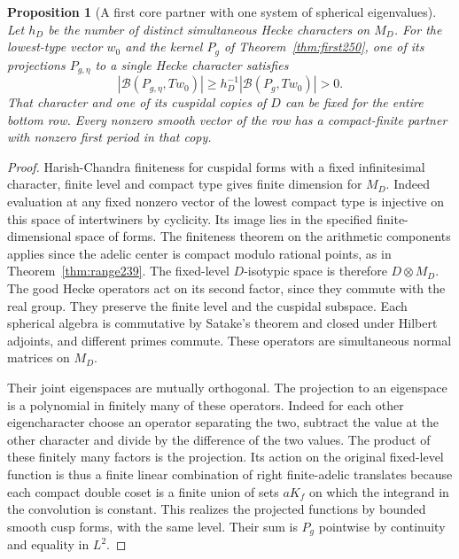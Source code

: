 \documentclass[a4paper,11pt]{article}
\newtheorem{proposition}{Proposition}[section]
\theoremstyle{definition}
\theoremstyle{remark}
\numberwithin{equation}{section}
\begin{document}
\begin{proposition}[A first core partner with one system of spherical eigenvalues]
\label{prop:heckecore252}
Let \(h_D\) be the number of distinct simultaneous Hecke characters on
\(M_D\). For the lowest-type vector \(w_0\) and the kernel \(P_g\) of
Theorem~\ref{thm:first250}, one of its projections \(P_{g,\eta}\) to a
single Hecke character satisfies
\[
 |\mathcal B(P_{g,\eta},Tw_0)|\ge h_D^{-1}|\mathcal B(P_g,Tw_0)|>0 .
\]
That character and one of its cuspidal copies of \(D\) can be fixed for
the entire bottom row. Every nonzero smooth vector of the row has a
compact-finite partner with nonzero first period in that copy.
\end{proposition}
\begin{proof}
Harish-Chandra finiteness for cuspidal forms with a fixed infinitesimal
character, finite level and compact type gives finite dimension for
\(M_D\). Indeed evaluation at any fixed nonzero vector of the lowest
compact type is injective on this space of intertwiners by cyclicity.
Its image lies in the specified finite-dimensional space of forms.
The finiteness theorem on the arithmetic components applies since the
adelic center is compact modulo rational points, as in
Theorem~\ref{thm:range239}. The fixed-level \(D\)-isotypic space is
therefore \(D\otimes M_D\). The good Hecke operators act on its second
factor, since they commute with the real group. They preserve the
finite level and the cuspidal subspace. Each spherical algebra is
commutative by Satake's theorem and closed under Hilbert adjoints,
and different primes commute. These operators are simultaneous normal
matrices on \(M_D\).

Their joint eigenspaces are mutually orthogonal. The projection to an
eigenspace is a polynomial in finitely many of these operators. Indeed
for each other eigencharacter choose an operator separating the two,
subtract the value at the other character and divide by the difference
of the two values. The product of these finitely many factors is the
projection. Its action on the original fixed-level function is thus a
finite linear combination of right finite-adelic translates because each
compact double coset is a finite union of sets \(aK_f\) on which
the integrand in the convolution is constant. This realizes the projected functions by
bounded smooth cusp forms, with the same level. Their sum is \(P_g\)
pointwise by continuity and equality in \(L^2\).


\end{proof}
\end{document}
